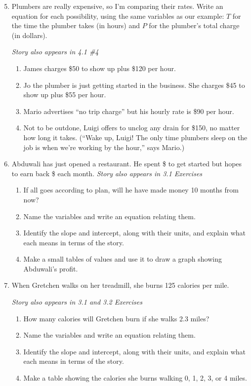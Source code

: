 \begin{enumerate} 
\setcounter{enumi}{4}

\item Plumbers are really expensive, so I'm comparing their rates.  Write an equation for each possibility, using the same variables as our example:  $T$ for the time the plumber takes (in hours) and $P$ for the plumber's total charge (in dollars). 

 \hfill \emph{Story also appears in 4.1 \#4}
\begin{enumerate}
\item James charges \$50 to show up plus \$120 per hour. 
\item Jo the plumber is just getting started in the business.  She charges \$45 to show up plus \$55 per hour.
\item Mario advertises ``no trip charge'' but his hourly rate is \$90 per hour. 
\item Not to be outdone, Luigi offers to unclog any drain for \$150, no matter how long it takes.  (``Wake up, Luigi! The only time plumbers sleep on the job is when we're working by the hour,'' says Mario.)
\end{enumerate} 

\item Abduwali has just opened a restaurant. He spent \$ to get started but hopes to earn back \$ each month.  \hfill \emph{Story also appears in 3.1 Exercises}
\begin{enumerate}
\item If all goes according to plan, will he have made money 10 months from now?
\item Name the variables and write an equation relating them.
\item Identify the slope and intercept, along with their units, and explain what each means in terms of the story. 
\item Make a small tables of values and use it to draw a graph showing Abduwali's profit.
\end{enumerate}

\item When Gretchen walks on her treadmill, she burns 125 calories per mile.

\hfill \emph{Story also appears in 3.1 and 3.2 Exercises}
\begin{enumerate}
\item How many calories will Gretchen burn if she walks 2.3 miles?
\item Name the variables and write an equation relating them.
\item Identify the slope and intercept, along with their units, and explain what each means in terms of the story. 
\item Make a table showing the calories she burns walking 0, 1, 2, 3, or 4 miles.
\end{enumerate} 


\end{enumerate}
